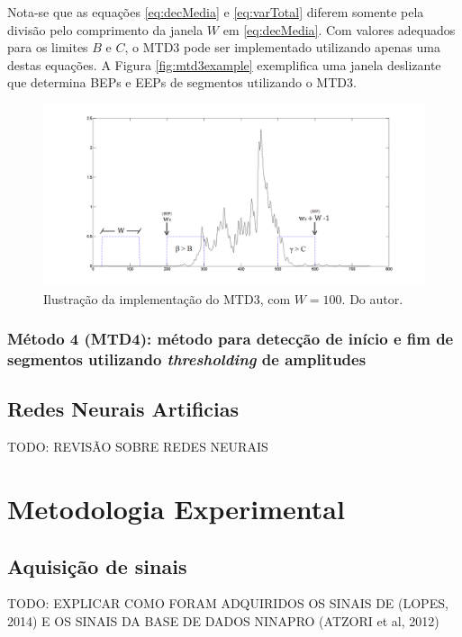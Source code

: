 \documentclass[
	12pt,				%
	openright,			%
	oneside,
	a4paper,			%
	english,			%
	francais,			%
	spanish,			%
	brazil				%
	]{abntex2}
\begin{document}
	Nota-se que as equações \ref{eq:decMedia} e \ref{eq:varTotal} diferem somente pela divisão pelo comprimento da janela $W$ em \ref{eq:decMedia}. Com valores adequados para os limites $B$ e $C$, o MTD3 pode ser implementado utilizando apenas uma destas equações. A Figura \ref{fig:mtd3example} exemplifica uma janela deslizante que determina BEPs e EEPs de segmentos utilizando o MTD3.
	
\begin{figure}
\centering
\includegraphics[width=\linewidth]{./img/mtd3ex.png}
\caption{Ilustração da implementação do MTD3, com $W = 100$. Do autor.}
\label{fig:mtd1example}
\end{figure}
	
\subsection{Método 4 (MTD4): método para detecção de início e fim de segmentos utilizando \emph{thresholding} de amplitudes}


\section{Redes Neurais Artificias}

	TODO: REVISÃO SOBRE REDES NEURAIS

\chapter{Metodologia Experimental}

\section{Aquisição de sinais}

	TODO: EXPLICAR COMO FORAM ADQUIRIDOS OS SINAIS DE (LOPES, 2014) E OS SINAIS DA BASE DE DADOS NINAPRO (ATZORI et al, 2012)
\end{document}
